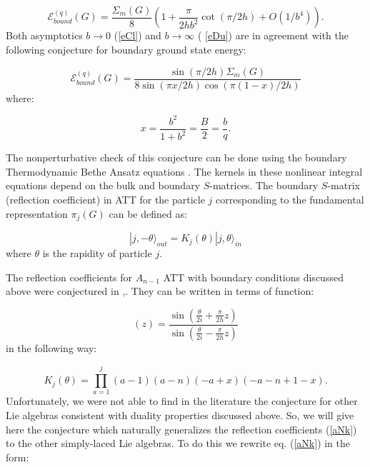 \documentclass[a4paper,12pt]{article}
\begin{document}
\begin{equation}
\mathcal{E}_{bound}^{(q)}(G)=\frac{\Sigma _m(G)}8\left( 1+\frac \pi
{2hb^2}\cot (\pi /2h)+O(1/b^4)\right) .  \label{eDu}
\end{equation}
Both asymptotics $b\rightarrow 0$ (\ref{eCl}) and $b\rightarrow \infty $ (%
\ref{eDu}) are in agreement with the following conjecture for boundary
ground state energy:

\begin{equation}
\mathcal{E}_{bound}^{(q)}(G)=\frac{\sin (\pi /2h)\Sigma _m(G)}
{8\sin (\pi x/2h)\cos (\pi (1-x)/2h)}  \label{eQ}
\end{equation}
where:

\begin{equation}
x=\frac{b^2}{1+b^2}=\frac{B}{2}=\frac bq.  \label{xB}
\end{equation}

The nonperturbative check of this conjecture can be done using the boundary
Thermodynamic Bethe Ansatz equations \cite{SSM}. The kernels in these
nonlinear integral equations depend on the bulk and boundary $S$-matrices.
The boundary $S$-matrix (reflection coefficient) in ATT for the particle $j$
corresponding to the fundamental representation $\pi _j(G)$ can be defined
as:

\begin{equation}
|j,-\theta \rangle _{out}=K_j(\theta )|j,\theta \rangle _{in}  \label{kI}
\end{equation}
where $\theta $ is the rapidity of particle $j$.

The reflection coefficients for $A_{n-1}$ ATT with boundary conditions
discussed above were conjectured in \cite{CODS},\cite{DELG}. They can be
written in terms of function:

\begin{equation}
\left( z\right) =\frac{\sin \left( \frac \theta {2i}+\frac \pi {2h}z\right) 
}{\sin \left( \frac \theta {2i}-\frac \pi {2h}z\right) }  \label{Z}
\end{equation}
in the following way:

\begin{equation}
K_j(\theta )=\prod\limits_{a=1}^j(a-1)(a-n)(-a+x)(-a-n+1-x).  \label{aNk}
\end{equation}
Unfortunately, we were not able to find in the literature the conjecture for
other Lie algebras consistent with duality properties
discussed above. 
So, we will give here the conjecture which naturally
generalizes the reflection coefficients (\ref{aNk}) to the other
simply-laced Lie algebras. To do this we rewrite eq. (\ref{aNk}) in the form:
\end{document}
